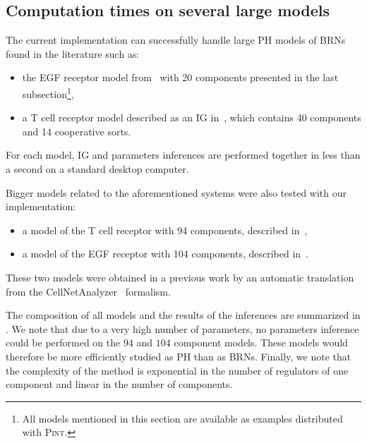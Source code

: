\subsection{Computation times on several large models}\label{ssec:cpu}

The current implementation can successfully handle large PH models of BRNs found in the literature such as:
\begin{itemize}
  \item the EGF receptor model from~\cite{Sahin09} with 20 components presented in the last
    subsection\footnote{All models mentioned in this section are available as examples distributed with \textsc{Pint}.},
  \item a T cell receptor model described as an IG in~\cite{Klamt06}, which contains 40 components and 14 cooperative sorts.
\end{itemize}
For each model, IG and parameters inferences are performed together in less than a second
on a standard desktop computer.

Bigger models related to the aforementioned systems were also tested with our implementation:
\begin{itemize}
  \item a model of the T cell receptor with 94 components, described in~\cite{SaezRodriguez2007},
  \item a model of the EGF receptor with 104 components, described in~\cite{Samaga2009}.
\end{itemize}
These two models were obtained in a previous work by an automatic translation from the CellNetAnalyzer~\cite{klamt2007structural} formalism.

The composition of all models and the results of the inferences are summarized in .
We note that due to a very high number of parameters, no parameters inference could be performed on the $94$ and $104$ component models.
These models would therefore be more efficiently studied as PH than as BRNs.
Finally, we note that the complexity of the method is exponential in the number of regulators of one
component and linear in the number of components.

